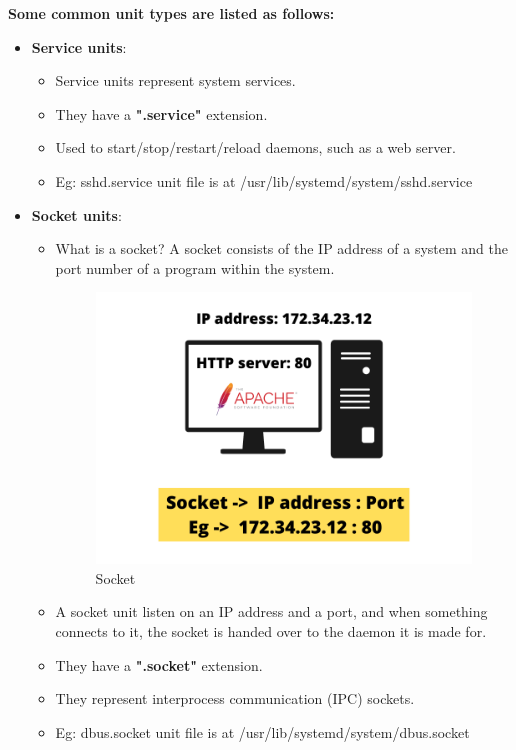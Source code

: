 \begin{flushleft}
	\textbf{Some common unit types are listed as follows:}
	\begin{itemize}
		\item \textbf{Service units}:
		\begin{itemize}
			\item Service units represent system services.
			\item They have a \textbf{".service"} extension.
			\item Used to start/stop/restart/reload daemons, such as a web server.
			\item Eg: sshd.service unit file is at /usr/lib/systemd/system/sshd.service
		\end{itemize}
		\bigskip\bigskip
		\item \textbf{Socket units}:
		\begin{itemize}
			\item What is a socket? A socket consists of the IP address of a system and the port number of a program within the system. 
			\begin{figure}[h!]
				\centering
				\includegraphics[scale=0.4]{content/chapter1/images/socket.png}
				\caption{Socket}
				\label{fig:socket1}
			\end{figure}
			\item A socket unit listen on an IP address and a port, and when something connects to it, the socket is handed over to the daemon it is made for.
			\item They have a \textbf{".socket"} extension.
			\item They represent interprocess communication (IPC) sockets.	
			\item Eg: dbus.socket unit file is at /usr/lib/systemd/system/dbus.socket

\end{itemize}
\end{itemize}
\end{flushleft}
